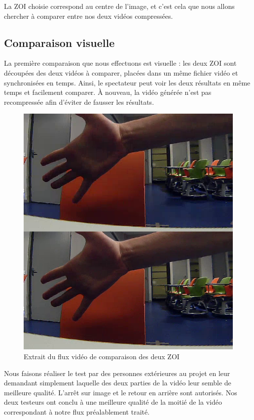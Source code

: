 \documentclass[11pt,a4paper]{article}
\begin{document}
\bigbreak
La ZOI choisie correspond au centre de l'image, et c'est cela que nous allons chercher à comparer entre nos deux vidéos compressées.

\subsection{Comparaison visuelle}
La première comparaison que nous effectuons est visuelle : les deux ZOI sont découpées des deux vidéos à comparer, placées dans un même fichier vidéo et synchronisées en temps.
Ainsi, le spectateur peut voir les deux résultats en même temps et facilement comparer.
À nouveau, la vidéo générée n'est pas recompressée afin d'éviter de fausser les résultats.

\begin{figure}[H]
\begin{center}
\includegraphics[scale=0.25]{images/comparaison_mosaique.png}
\end{center}
\caption{Extrait du flux vidéo de comparaison des deux ZOI}
\label{}
\end{figure}

\bigbreak
Nous faisons réaliser le test par des personnes extérieures au projet en leur demandant simplement laquelle des deux parties de la vidéo leur semble de meilleure qualité.
L'arrêt sur image et le retour en arrière sont autorisés.
Nos deux testeurs ont conclu à une meilleure qualité de la moitié de la vidéo correspondant à notre flux préalablement traité.
\end{document}
